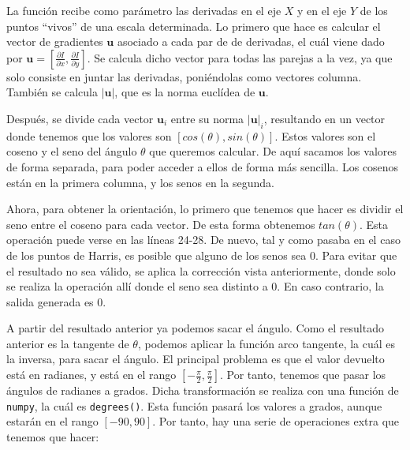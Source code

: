 \documentclass[11pt,a4paper]{article}
\begin{document}
La función recibe como parámetro las derivadas en el eje $X$ y en el eje $Y$ de los
puntos ``vivos'' de una escala determinada. Lo primero que hace es calcular el vector
de gradientes $\mathbf{u}$ asociado a cada par de de derivadas, el cuál viene dado
por $\mathbf{u} = [\frac{\partial I}{\partial x}, \frac{\partial I}{\partial y}]$. Se calcula
dicho vector para todas las parejas a la vez, ya que solo consiste en juntar las derivadas,
poniéndolas como vectores columna. También se calcula $\mathbf{|u|}$, que es la norma
euclídea de  $\mathbf{u}$.

Después, se divide cada vector  $\mathbf{u}_i$ entre su norma
$\mathbf{|u|}_i$, resultando en un vector donde tenemos que los valores son $[cos(\theta), sin(\theta)]$.
Estos valores son el coseno y el seno del ángulo $\theta$ que queremos calcular. De aquí
sacamos los valores de forma separada, para poder acceder a ellos de forma más
sencilla. Los cosenos están en la primera columna, y los senos en la segunda.

Ahora, para obtener la orientación, lo primero que tenemos que hacer es dividir
el seno entre el coseno para cada vector. De esta forma obtenemos $tan(\theta)$.
Esta operación puede verse en las líneas 24-28. De nuevo, tal y como pasaba en el
caso de los puntos de Harris, es posible que alguno de los senos sea 0. Para evitar
que el resultado no sea válido, se aplica la corrección vista anteriormente, donde
solo se realiza la operación allí donde el seno sea distinto a 0. En caso contrario,
la salida generada es 0.

A partir del resultado anterior ya podemos sacar el ángulo. Como el resultado
anterior es la tangente de $\theta$, podemos aplicar la función arco tangente, la
cuál es la inversa, para sacar el ángulo. El principal problema es que el valor
devuelto está en radianes, y está en el rango $[-\frac{\pi}{2}, \frac{\pi}{2}]$. Por tanto, tenemos
que pasar los ángulos de radianes a grados. Dicha transformación se realiza con una función de
\texttt{numpy}, la cuál es \texttt{degrees()}. Esta función pasará los valores a
grados, aunque estarán en el rango $[-90, 90]$. Por tanto, hay una serie
de operaciones extra que tenemos que hacer:
\end{document}

